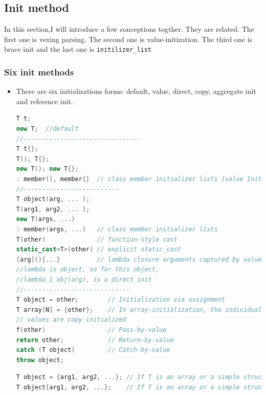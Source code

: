 \documentclass[a4paper,11pt,twoside]{book}
\begin{document}
\subsection{Init method}
In this section,I will introduce a few conceptions togther. They are related. The first one is vexing parsing. The second one is value-initization. The third one is brace init and the last one is \texttt{initilizer\_list}

\subsubsection{Six init methods}
\begin{itemize}
	\item There are six initializations forms: default, value, direct, copy, aggregate init and reference init.
\begin{lstlisting}[frame=single, language=c++]
T t;
new T;  //default
//--------------------------------
T t{};
T(); T{};
new T(); new T{};
: member(), member{}  // class member initializer lists (value Init)
//--------------------------
T object(arg, ... );
T(arg1, arg2, ... );
new T(args, ...)
: member(args, ...)   // class member initializer lists
T(other)              // function-style cast
static_cast<T>(other) // explicit static_cast
[arg](){...}          // lambda closure arguments captured by value
//lambda is object, so for this object, 
//lambda_1 obj(arg), is a direct init
//-----------------------------
T object = other;        // Initialization via assignment
T array[N] = {other};    // In array-initialization, the individual
// values are copy-initialized
f(other)                 // Pass-by-value
return other;            // Return-by-value
catch (T object)         // Catch-by-value
throw object;
\end{lstlisting}

\begin{lstlisting}[frame=single, language=c++]
T object = {arg1, arg2, ...}; // If T is an array or a simple struct
T object{arg1, arg2, ...};    // If T is an array or a simple struct
\end{lstlisting}


\end{itemize}
\end{document}
